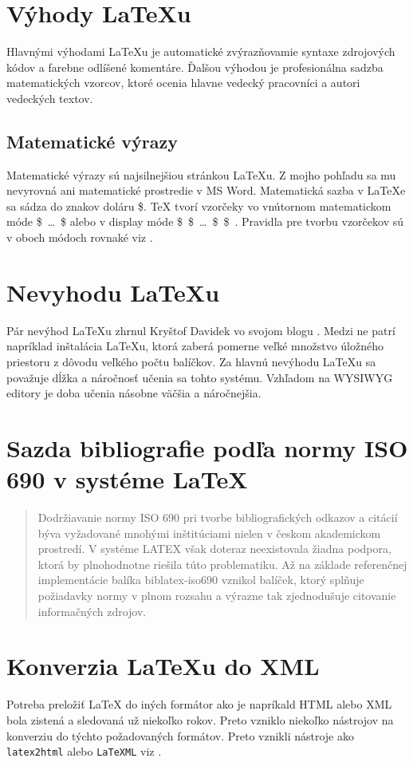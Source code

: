\documentclass[a4paper, 11pt]{article}
\begin{document}
\section{Výhody \LaTeX u}
Hlavnými výhodami \LaTeX u je automatické zvýrazňovamie syntaxe zdrojových kódov a farebne odlíšené komentáre. Ďalšou výhodou je profesionálna sadzba matematických vzorcov, ktoré ocenia hlavne vedecký pracovníci a autori vedeckých textov. \cite{BartlikJakub2017Sopp}

\subsection{Matematické výrazy}
Matematické výrazy sú najsilnejšiou stránkou \LaTeX u. Z mojho pohľadu sa mu nevyrovná ani matematické prostredie v MS Word. Matematická sazba v \LaTeX e sa sádza do znakov doláru \$. \TeX\: tvorí vzorčeky vo vnútornom matematickom móde \$~\dots~\$ alebo v display móde \$~\$~\dots~\$~\$~. Pravidla pre tvorbu vzorčekov sú v oboch módoch rovnaké viz \cite{Olsak2021}.

\section{Nevyhodu \LaTeX u}
Pár nevýhod \LaTeX u zhrnul Kryštof Davidek vo svojom blogu \cite{KrystofDavidek}. Medzi ne patrí napríklad inštalácia \LaTeX u, ktorá zaberá pomerne veľké množstvo úložného priestoru z dôvodu veľkého počtu balíčkov. Za hlavnú nevýhodu \LaTeX u sa považuje dĺžka a náročnosť učenia sa tohto systému. Vzhľadom na WYSIWYG editory je doba učenia násobne väčšia a náročnejšia.

\section{Sazda bibliografie podľa normy ISO 690 v systéme \LaTeX}
\begin{quote}
    Dodržiavanie normy ISO 690 pri tvorbe bibliografických odkazov a citácií býva vyžadované mnohými inštitúciami nielen v českom akademickom prostredí. V systéme LATEX však doteraz neexistovala žiadna podpora, ktorá by plnohodnotne riešila túto problematiku. Až na základe referenčnej implementácie balíka biblatex-iso690 vznikol balíček, ktorý splňuje požiadavky normy v plnom rozsahu a výrazne tak zjednodušuje citovanie informačných zdrojov. \cite{Luptak2016}
\end{quote}


\section{Konverzia \LaTeX u do XML}
Potreba preložiť \LaTeX\: do iných formátor ako je napríkald HTML alebo XML bola zistená a sledovaná už niekoľko rokov. Preto vzniklo niekoľko nástrojov na konverziu do týchto požadovaných formátov. Preto vznikli nástroje ako \texttt{latex2html} alebo \texttt{LaTeXML} viz \cite{KohlhaseMichael2008ULaa}.


\newpage
	
	\renewcommand{\refname}{Literatura}
	
\end{document}
